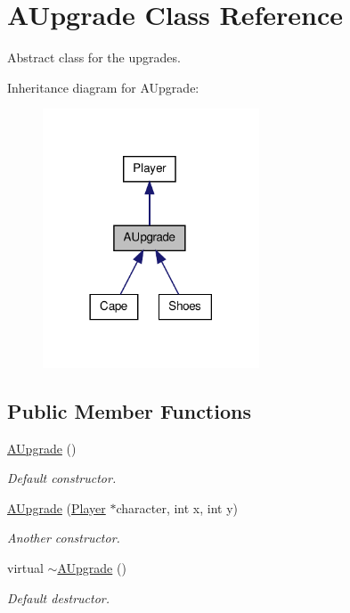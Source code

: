 \hypertarget{class_a_upgrade}{\section{A\-Upgrade Class Reference}
\label{class_a_upgrade}
}


Abstract class for the upgrades.  




Inheritance diagram for A\-Upgrade\-:\nopagebreak
\begin{figure}[H]
\begin{center}
\leavevmode
\includegraphics[width=182pt]{class_a_upgrade__inherit__graph}
\end{center}
\end{figure}
\subsection*{Public Member Functions}
\begin{DoxyCompactItemize}
\item 
\hypertarget{class_a_upgrade_a657c30a4f6115e0e4889791e16a55515}{\hyperlink{class_a_upgrade_a657c30a4f6115e0e4889791e16a55515}{A\-Upgrade} ()}\label{class_a_upgrade_a657c30a4f6115e0e4889791e16a55515}

\begin{DoxyCompactList}\small\item\em Default constructor. \end{DoxyCompactList}\item 
\hyperlink{class_a_upgrade_a1c08a05a63bbd9f90ea6ef96c662ed16}{A\-Upgrade} (\hyperlink{class_player}{Player} $\ast$character, int x, int y)
\begin{DoxyCompactList}\small\item\em Another constructor. \end{DoxyCompactList}\item 
\hypertarget{class_a_upgrade_abf739f8ff28186a086f751cf40a2fdbc}{virtual \hyperlink{class_a_upgrade_abf739f8ff28186a086f751cf40a2fdbc}{$\sim$\-A\-Upgrade} ()}\label{class_a_upgrade_abf739f8ff28186a086f751cf40a2fdbc}

\begin{DoxyCompactList}\small\item\em Default destructor. \end{DoxyCompactList}\end{DoxyCompactItemize}
